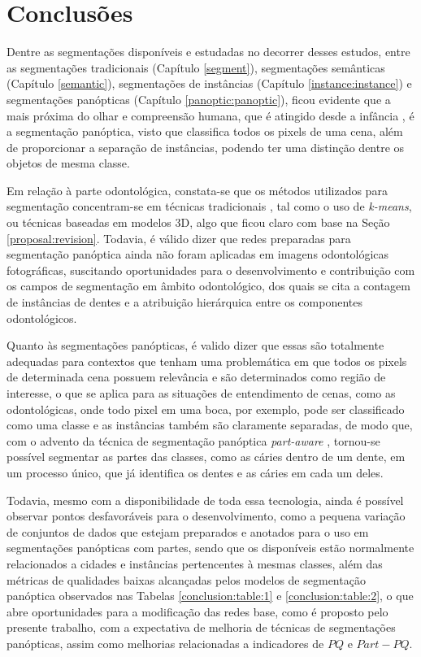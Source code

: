 \newpage
\clearpage
\section{Conclusões}
\label{conclusion}

Dentre as segmentações disponíveis e estudadas no decorrer desses estudos, entre as segmentações tradicionais (Capítulo \ref{segment}), segmentações semânticas (Capítulo \ref{semantic}), segmentações de instâncias (Capítulo \ref{instance:instance}) e segmentações panópticas (Capítulo \ref{panoptic:panoptic}), ficou evidente que a mais próxima do olhar e compreensão humana, que é atingido desde a infância \cite{Mohan2020}, é a segmentação panóptica, visto que classifica todos os pixels de uma cena, além de proporcionar a separação de instâncias, podendo ter uma distinção dentre os objetos de mesma classe.

Em relação à parte odontológica, constata-se que os métodos utilizados para segmentação concentram-se em técnicas tradicionais \cite{Hammad2020}, tal como o uso de \textit{k-means}, ou técnicas baseadas em modelos 3D, algo que ficou claro com base na Seção \ref{proposal:revision}. Todavia, é válido dizer que redes preparadas para segmentação panóptica ainda não foram aplicadas em imagens odontológicas fotográficas, suscitando oportunidades para o desenvolvimento e contribuição com os campos de segmentação em âmbito odontológico, dos quais se cita a contagem de instâncias de dentes e a atribuição hierárquica entre os componentes odontológicos.

Quanto às segmentações panópticas, é valido dizer que essas são totalmente adequadas para contextos que tenham uma problemática em que todos os pixels de determinada cena possuem relevância e são determinados como região de interesse, o que se aplica para as situações de entendimento de cenas, como as odontológicas, onde todo pixel em uma boca, por exemplo, pode ser classificado como uma classe e as instâncias também são claramente separadas, de modo que, com o advento da técnica de segmentação panóptica \textit{part-aware} \cite{DeGeus2021}, tornou-se possível segmentar as partes das classes, como as cáries dentro de um dente, em um processo único, que já identifica os dentes e as cáries em cada um deles.

Todavia, mesmo com a disponibilidade de toda essa tecnologia, ainda é possível observar pontos desfavoráveis para o desenvolvimento, como a pequena variação de conjuntos de dados que estejam preparados e anotados para o uso em segmentações panópticas com partes, sendo que os disponíveis estão normalmente relacionados a cidades e instâncias pertencentes à mesmas classes, além das métricas de qualidades baixas alcançadas pelos modelos de segmentação panóptica observados nas Tabelas \ref{conclusion:table:1} e \ref{conclusion:table:2}, o que abre oportunidades para a modificação das redes base, como é proposto pelo presente trabalho, com a expectativa de melhoria de técnicas de segmentações panópticas, assim como melhorias relacionadas a indicadores de $PQ$ e $Part-PQ$.

